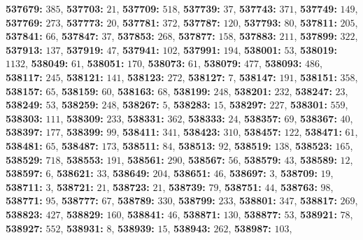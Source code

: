 \textsf{\bfseries 537679:} $385$, \textsf{\bfseries 537703:} $21$, \textsf{\bfseries 537709:} $518$, \textsf{\bfseries 537739:} $37$, \textsf{\bfseries 537743:} $371$, \textsf{\bfseries 537749:} $149$, \textsf{\bfseries 537769:} $273$, \textsf{\bfseries 537773:} $20$, \textsf{\bfseries 537781:} $372$, \textsf{\bfseries 537787:} $120$, \textsf{\bfseries 537793:} $80$, \textsf{\bfseries 537811:} $205$, \textsf{\bfseries 537841:} $66$, \textsf{\bfseries 537847:} $37$, \textsf{\bfseries 537853:} $268$, \textsf{\bfseries 537877:} $158$, \textsf{\bfseries 537883:} $211$, \textsf{\bfseries 537899:} $322$, \textsf{\bfseries 537913:} $137$, \textsf{\bfseries 537919:} $47$, \textsf{\bfseries 537941:} $102$, \textsf{\bfseries 537991:} $194$, \textsf{\bfseries 538001:} $53$, \textsf{\bfseries 538019:} $1132$, \textsf{\bfseries 538049:} $61$, \textsf{\bfseries 538051:} $170$, \textsf{\bfseries 538073:} $61$, \textsf{\bfseries 538079:} $477$, \textsf{\bfseries 538093:} $486$, \textsf{\bfseries 538117:} $245$, \textsf{\bfseries 538121:} $141$, \textsf{\bfseries 538123:} $272$, \textsf{\bfseries 538127:} $7$, \textsf{\bfseries 538147:} $191$, \textsf{\bfseries 538151:} $358$, \textsf{\bfseries 538157:} $65$, \textsf{\bfseries 538159:} $60$, \textsf{\bfseries 538163:} $68$, \textsf{\bfseries 538199:} $248$, \textsf{\bfseries 538201:} $232$, \textsf{\bfseries 538247:} $23$, \textsf{\bfseries 538249:} $53$, \textsf{\bfseries 538259:} $248$, \textsf{\bfseries 538267:} $5$, \textsf{\bfseries 538283:} $15$, \textsf{\bfseries 538297:} $227$, \textsf{\bfseries 538301:} $559$, \textsf{\bfseries 538303:} $111$, \textsf{\bfseries 538309:} $233$, \textsf{\bfseries 538331:} $362$, \textsf{\bfseries 538333:} $24$, \textsf{\bfseries 538357:} $69$, \textsf{\bfseries 538367:} $40$, \textsf{\bfseries 538397:} $177$, \textsf{\bfseries 538399:} $99$, \textsf{\bfseries 538411:} $341$, \textsf{\bfseries 538423:} $310$, \textsf{\bfseries 538457:} $122$, \textsf{\bfseries 538471:} $61$, \textsf{\bfseries 538481:} $65$, \textsf{\bfseries 538487:} $173$, \textsf{\bfseries 538511:} $84$, \textsf{\bfseries 538513:} $92$, \textsf{\bfseries 538519:} $138$, \textsf{\bfseries 538523:} $165$, \textsf{\bfseries 538529:} $718$, \textsf{\bfseries 538553:} $191$, \textsf{\bfseries 538561:} $290$, \textsf{\bfseries 538567:} $56$, \textsf{\bfseries 538579:} $43$, \textsf{\bfseries 538589:} $12$, \textsf{\bfseries 538597:} $6$, \textsf{\bfseries 538621:} $33$, \textsf{\bfseries 538649:} $204$, \textsf{\bfseries 538651:} $46$, \textsf{\bfseries 538697:} $3$, \textsf{\bfseries 538709:} $19$, \textsf{\bfseries 538711:} $3$, \textsf{\bfseries 538721:} $21$, \textsf{\bfseries 538723:} $21$, \textsf{\bfseries 538739:} $79$, \textsf{\bfseries 538751:} $44$, \textsf{\bfseries 538763:} $98$, \textsf{\bfseries 538771:} $95$, \textsf{\bfseries 538777:} $67$, \textsf{\bfseries 538789:} $330$, \textsf{\bfseries 538799:} $233$, \textsf{\bfseries 538801:} $347$, \textsf{\bfseries 538817:} $269$, \textsf{\bfseries 538823:} $427$, \textsf{\bfseries 538829:} $160$, \textsf{\bfseries 538841:} $46$, \textsf{\bfseries 538871:} $130$, \textsf{\bfseries 538877:} $53$, \textsf{\bfseries 538921:} $78$, \textsf{\bfseries 538927:} $552$, \textsf{\bfseries 538931:} $8$, \textsf{\bfseries 538939:} $15$, \textsf{\bfseries 538943:} $262$, \textsf{\bfseries 538987:} $103$, 
